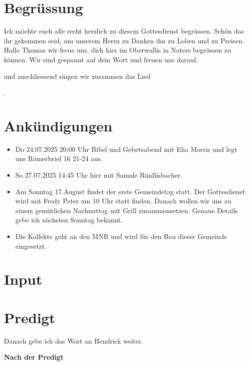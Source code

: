 \documentclass{../../inc/mybib}
\begin{document}
\section{Begrüssung}

Ich möchte euch alle recht herzlich zu diesem Gottesdienst begrüssen. Schön das ihr gekommen seid, um unserem Herrn zu Danken ihn zu Loben und zu Preisen.
Hallo Thomas wir freue uns, dich hier im Oberwallis in Naters begrüssen zu können. Wir sind gespannt auf dein Wort und freuen uns darauf.

\beten{} und anschliessend singen wir zusammen das Lied

{}.

\section{Ankündigungen}
\begin{itemize}
    \item {} Do 24.07.2025 20:00 Uhr Bibel und Gebetsabend mit Elia Morris  und legt uns Römerbrief 16 21-24 aus.
    \item {} So 27.07.2025 14:45 Uhr hier mit Samule Rindlisbacher.
    \item {} Am Sonntag 17.August findet der erste Gemeindetag statt. Der Gottesdienst wird mit Fredy Peter um 10 Uhr statt finden. Danach wollen wir uns zu einem gemütlichen Nachmittag mit Grill zusammensetzen. Genaue Details gebe ich nächsten Sonntag bekannt.
    \item {} Die Kollekte geht an den MNR und wird für den Bau dieser Gemeinde eingesetzt.
\end{itemize}

\section{ Input }
\begin{spacing}{1.5}

\end{spacing}

\section{Predigt}

Danach gebe ich das Wort an Hendrick weiter.

\textbf{Nach der Predigt}
\end{document}
